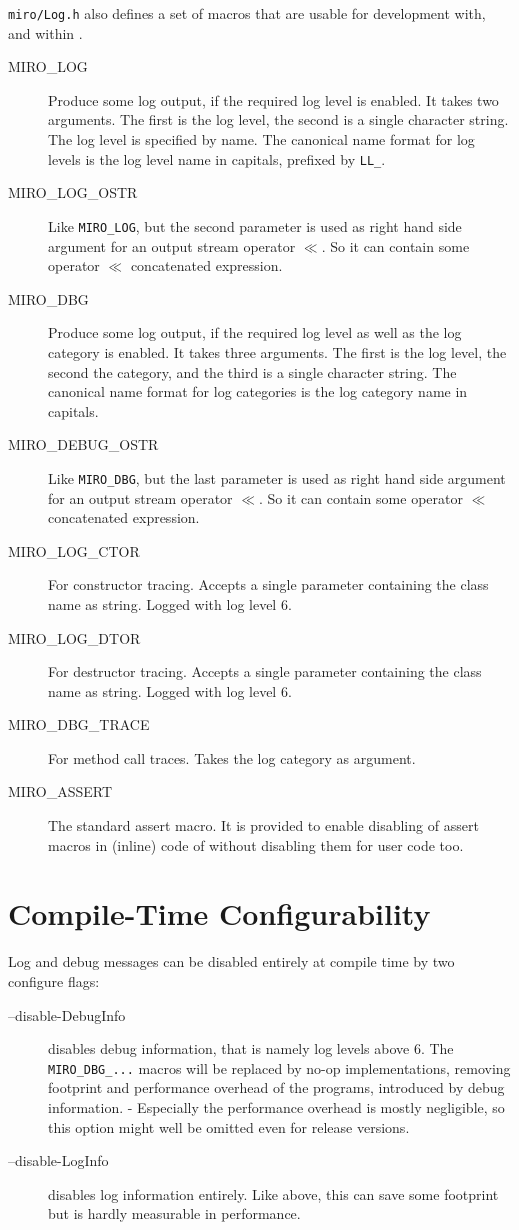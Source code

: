 \texttt{miro/Log.h} also defines a set of macros that are usable for
development with, and within \miro.
\begin{description}
\item[MIRO\_LOG] Produce some log output, if the required log
  level is enabled. It takes two arguments. The first is the log level,
  the second is a single character string. The log level is specified
  by name. The canonical name format for log levels is the log level
  name in capitals, prefixed by \texttt{LL\_}.
\item[MIRO\_LOG\_OSTR] Like \texttt{MIRO\_LOG}, but the second
  parameter is used as right hand side argument for an output stream
  operator $\ll$. So it can contain some operator $\ll$ concatenated
  expression.
\item[MIRO\_DBG] Produce some log output, if the required log level as
  well as the log category is enabled. It takes three arguments. The
  first is the log level, the second the category, and the third is a
  single character string. The canonical name format for log
  categories is the log category name in capitals.
\item[MIRO\_DEBUG\_OSTR] Like \texttt{MIRO\_DBG}, but the last
  parameter is used as right hand side argument for an output stream
  operator $\ll$. So it can contain some operator $\ll$ concatenated
  expression.
\item[MIRO\_LOG\_CTOR] For constructor tracing. Accepts a single
  parameter containing the class name as string. Logged with log level
  6.
\item[MIRO\_LOG\_DTOR] For destructor tracing. Accepts a single
  parameter containing the class name as string. Logged with log level
  6.
\item[MIRO\_DBG\_TRACE] For method call traces. Takes the log
  category as argument.
\item[MIRO\_ASSERT] The standard assert macro. It is provided to
  enable disabling of assert macros in (inline) code of \miro without
  disabling them for user code too.
\end{description}

\section{Compile-Time Configurability}

Log and debug messages can be disabled entirely at compile time by two
configure flags: 
\begin{description}
\item[--disable-DebugInfo] disables debug information, that is namely
  log levels above 6. The \texttt{MIRO\_DBG\_...} macros will be
  replaced by no-op implementations, removing footprint and performance
  overhead of the programs, introduced by debug information. -
  Especially the performance overhead is mostly negligible, so this
  option might well be omitted even for release versions.
\item[--disable-LogInfo] disables log information entirely. Like
  above, this can save some footprint but is hardly measurable in
  performance.
\end{description}

